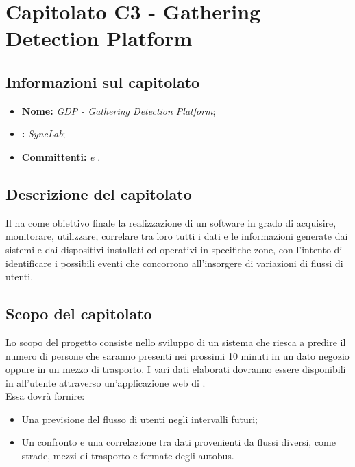 \section{Capitolato C3 - Gathering Detection Platform}\label{C3}
\subsection{Informazioni sul capitolato}
\begin{itemize}
	\item \textbf{Nome:} \textit{GDP - Gathering Detection Platform};
	\item \textbf{:} \textit{SyncLab};
	\item \textbf{Committenti:} \textit{\VT{} e \CR{}}.
\end{itemize}

\subsection{Descrizione del capitolato}
Il  ha come obiettivo finale la realizzazione di un  software in grado di acquisire, monitorare, utilizzare, correlare tra loro tutti i dati e le informazioni generate dai sistemi e dai dispositivi installati ed operativi in specifiche zone, con l’intento di identificare i possibili eventi che concorrono all’insorgere di variazioni di flussi di utenti.

\subsection{Scopo del capitolato}
Lo scopo del progetto consiste nello sviluppo di un sistema che riesca a predire il numero di persone che saranno presenti nei prossimi 10 minuti in un dato negozio oppure in un mezzo di trasporto. I vari dati elaborati dovranno essere disponibili in  all'utente attraverso un'applicazione web di . \\
Essa dovrà fornire:
\begin{itemize}
	\item Una previsione del flusso di utenti negli intervalli futuri;
	\item Un confronto e una correlazione tra dati provenienti da flussi diversi, come strade, mezzi di trasporto e fermate degli autobus.
\end{itemize}

